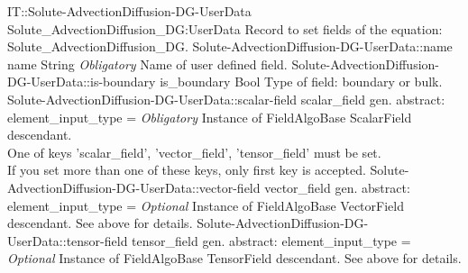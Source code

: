 \begin{RecordType}
	{IT::Solute-AdvectionDiffusion-DG-UserData}
	{Solute{\_}AdvectionDiffusion{\_}DG:UserData}
	{}%
	{}%
	{{{Record to set fields of the equation: Solute{\_}AdvectionDiffusion{\_}DG.}%
}}
		\RecKey
			{Solute-AdvectionDiffusion-DG-UserData::name}
			{name}
			{{String}}{}
			{ \it{Obligatory}}
			{{{Name of user defined field.}%
}}
		\RecKey
			{Solute-AdvectionDiffusion-DG-UserData::is-boundary}
			{is{\_}boundary}
			{{Bool}}{}
			{ }
			{{{Type of field: boundary or bulk.}%
}}
		\RecKey
			{Solute-AdvectionDiffusion-DG-UserData::scalar-field}
			{scalar{\_}field}
			{{gen. abstract: }}{{element{\_}input{\_}type}{ = }}
			{ \it{Obligatory}}
			{{{Instance of FieldAlgoBase ScalarField descendant.}\\{
One of keys 'scalar{\_}field', 'vector{\_}field', 'tensor{\_}field' must be set.}\\{
If you set more than one of these keys, only first key is accepted.}%
}}
		\RecKey
			{Solute-AdvectionDiffusion-DG-UserData::vector-field}
			{vector{\_}field}
			{{gen. abstract: }}{{element{\_}input{\_}type}{ = }}
			{ \it{Optional}}
			{{{Instance of FieldAlgoBase VectorField descendant.
See above for details.}%
}}
		\RecKey
			{Solute-AdvectionDiffusion-DG-UserData::tensor-field}
			{tensor{\_}field}
			{{gen. abstract: }}{{element{\_}input{\_}type}{ = }}
			{ \it{Optional}}
			{{{Instance of FieldAlgoBase TensorField descendant.
See above for details.}%
}}
\end{RecordType}
